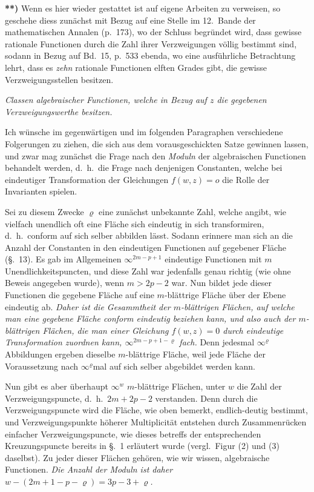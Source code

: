 \documentclass{article}
\begin{document}
\textbf{**)} Wenn es hier wieder gestattet ist auf eigene Arbeiten zu verweisen, so geschehe diess zunächst mit Bezug auf eine Stelle im 12.\ Bande der mathematischen Annalen (p.~173), wo der Schluss begründet wird, dass gewisse rationale Functionen durch die Zahl ihrer Verzweigungen völlig bestimmt sind, sodann in Bezug auf Bd.~15, p.~533 ebenda, wo eine ausführliche Betrachtung lehrt, dass es \emph{zehn} rationale Functionen elften Grades gibt, die gewisse Verzweigungsstellen besitzen.

\emph{Classen algebraischer Functionen, welche in Bezug auf $z$ die gegebenen Verzweigungswerthe besitzen.}

Ich wünsche im gegenwärtigen und im folgenden Paragraphen verschiedene Folgerungen zu ziehen, die sich aus dem vorausgeschickten Satze gewinnen lassen, und zwar mag zunächst die Frage nach den \emph{Moduln} der algebraischen Functionen behandelt werden, d.\ h.\ die Frage nach denjenigen Constanten, welche bei eindeutiger Transformation der Gleichungen $f(w, z) = o$ die Rolle der Invarianten spielen.

Sei zu diesem Zwecke $\varrho$ eine zunächst unbekannte Zahl, welche angibt, wie vielfach unendlich oft eine Fläche sich eindeutig in sich transformiren, d.\ h.\ conform auf sich selber abbilden lässt. Sodann erinnere man sich an die Anzahl der Constanten in den eindeutigen Functionen auf gegebener Fläche (§.~13). Es gab im Allgemeinen $\infty^{2m - p + 1}$ eindeutige Functionen mit $m$ Unendlichkeitspuncten, und diese Zahl war jedenfalls genau richtig (wie ohne Beweis angegeben wurde), wenn $m > 2p - 2$ war. Nun bildet jede dieser Functionen die gegebene Fläche auf eine $m$-blättrige Fläche über der Ebene eindeutig ab. \emph{Daher ist die Gesammtheit der $m$-blättrigen Flächen, auf welche man eine gegebene Fläche conform eindeutig beziehen kann, und also auch der $m$-blättrigen Flächen, die man einer Gleichung $f(w, z) = 0$ durch eindeutige Transformation zuordnen kann, $\infty^{2m - p + 1 - \varrho}$ fach.} Denn jedesmal $\infty^{\varrho}$ Abbildungen ergeben dieselbe $m$-blättrige Fläche, weil jede Fläche der Voraussetzung nach $\infty^{\varrho}$mal auf sich selber abgebildet werden kann.

Nun gibt es aber überhaupt $\infty^{w}$ $m$-blättrige Flächen, unter $w$ die Zahl der Verzweigungspuncte, d.\ h.\ $2m + 2p - 2$ verstanden. Denn durch die Verzweigungspuncte wird die Fläche, wie oben bemerkt, endlich-deutig bestimmt, und Verzweigungspunkte höherer Multiplicität entstehen durch Zusammenrücken einfacher Verzweigungspuncte, wie dieses betreffs der entsprechenden Kreuzungspuncte bereits in §.~1 erläutert wurde (vergl.\ Figur (2) und (3) daselbst). Zu jeder dieser Flächen gehören, wie wir wissen, algebraische Functionen. \emph{Die Anzahl der Moduln ist daher $w - (2m + 1 - p - \varrho) = 3p - 3 + \varrho$.}
\end{document}
